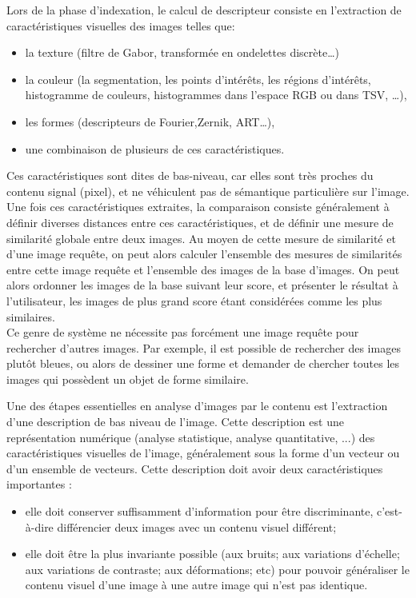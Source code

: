 Lors de la phase d'indexation, le calcul de descripteur consiste en l'extraction de caractéristiques visuelles des images telles que:
\begin{itemize}
	\item la texture (filtre de Gabor, transformée en ondelettes discrète…)
	\item la couleur (la segmentation, les points d’intérêts, les régions d’intérêts,
	histogramme de couleurs, histogrammes dans l'espace RGB ou dans TSV, …),
	\item les formes (descripteurs de Fourier,Zernik, ART…),
	\item une combinaison de plusieurs de ces caractéristiques.
\end{itemize}

Ces caractéristiques sont dites de bas-niveau, car elles sont très proches du contenu signal (pixel), et ne véhiculent pas de sémantique particulière sur l'image.\\

Une fois ces caractéristiques extraites, la comparaison consiste généralement à définir diverses distances entre ces caractéristiques, et de définir une mesure de similarité globale
entre deux images. Au moyen de cette mesure de similarité et d'une image requête, on peut alors calculer l'ensemble des mesures de similarités entre cette image requête et l'ensemble des images de la base d'images. On peut alors ordonner les images de la base suivant leur score, et présenter le résultat à l'utilisateur, les images de plus grand score étant considérées comme les plus similaires.\\

Ce genre de système ne nécessite pas forcément une image requête pour rechercher d'autres images. Par exemple, il est possible de rechercher des images plutôt bleues, ou alors de dessiner une forme et demander de chercher toutes les images qui possèdent un objet de forme similaire.



Une des étapes essentielles en analyse d'images par le contenu est l'extraction d'une description de bas niveau de l’image. Cette description est une représentation numérique (analyse statistique, analyse quantitative, ...) des caractéristiques visuelles de l'image, généralement sous la forme d’un vecteur ou d’un ensemble de vecteurs.
Cette description doit avoir deux caractéristiques importantes :
\begin{itemize}
	\item elle doit conserver suffisamment d’information pour être discriminante, c’est-à-dire différencier deux images avec un contenu visuel différent;
	\item elle doit être la plus invariante possible (aux bruits; aux variations d’échelle; aux variations de contraste; aux déformations; etc) pour pouvoir généraliser le contenu visuel d’une image à une autre image qui n’est pas identique.
\end{itemize}


